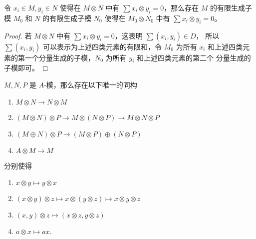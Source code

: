 \begin{corollary}\label{coro:tensor product finite generated}
  令 $x_i\in M,y_i\in N$ 使得在 $M\otimes N$ 中有 $\sum x_i\otimes y_i=0$，那么存在
  $M$ 的有限生成子模 $M_0$ 和 $N$ 的有限生成子模 $N_0$ 使得在 $M_0\otimes N_0$
  中有 $\sum x_i\otimes y_i=0$。
\end{corollary}
\begin{proof}
  若 $M\otimes N$ 中有 $\sum x_i\otimes y_i=0$，这表明 $\sum (x_i,y_i)\in D$，
  所以 $\sum (x_i,y_i)$ 可以表示为上述四类元素的有限和，令 $M_0$ 为所有 $x_i$
  和上述四类元素的第一个分量生成的子模，$N_0$ 为所有 $y_i$ 和上述四类元素的第二个
  分量生成的子模即可。
\end{proof}

\begin{proposition}
  $M,N,P$ 是 $A$-模，那么存在以下唯一的同构
  \begin{enumerate}
    \item $M\otimes N\to N\otimes M$
    \item $(M\otimes N)\otimes P\to M\otimes(N\otimes P)\to M\otimes N\otimes P$
    \item $(M\oplus N)\otimes P\to (M\otimes P)\oplus (N\otimes P)$
    \item $A\otimes M\to M$
  \end{enumerate}
  分别使得
  \begin{enumerate}
    \item $x\otimes y\mapsto y\otimes x$
    \item $(x\otimes y)\otimes z\mapsto x\otimes(y\otimes z)\mapsto x\otimes y\otimes z$
    \item $(x,y)\otimes z\mapsto (x\otimes z,y\otimes z)$
    \item $a\otimes x\mapsto ax$.
  \end{enumerate}
\end{proposition}
